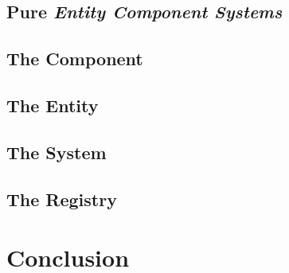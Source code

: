 \documentclass{article}
\begin{document}
    \subsection{Pure \textit{Entity Component Systems}}
    \subsection{The Component}
    \subsection{The Entity}
    \subsection{The System}
    \subsection{The Registry}

    \section{Conclusion}

    
\end{document}
